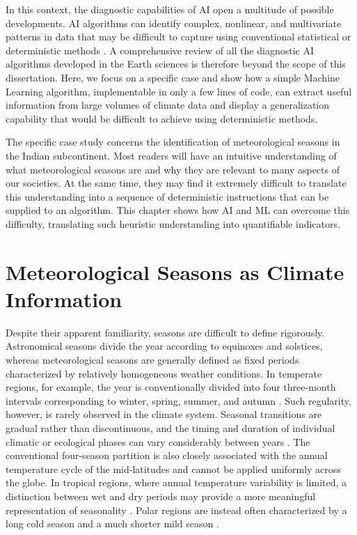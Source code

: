 In this context, the diagnostic capabilities of AI open a multitude of possible developments. AI algorithms can identify complex, nonlinear, and multivariate patterns in data that may be difficult to capture using conventional statistical or deterministic methods \citep{reichstein_deep_2019}. A comprehensive review of all the diagnostic AI algorithms developed in the Earth sciences is therefore beyond the scope of this dissertation. Here, we focus on a specific case and show how a simple Machine Learning algorithm, implementable in only a few lines of code, can extract useful information from large volumes of climate data and display a generalization capability that would be difficult to achieve using deterministic methods.

The specific case study concerns the identification of meteorological seasons in the Indian subcontinent. Most readers will have an intuitive understanding of what meteorological seasons are and why they are relevant to many aspects of our societies. At the same time, they may find it extremely difficult to translate this understanding into a sequence of deterministic instructions that can be supplied to an algorithm. This chapter shows how AI and ML can overcome this difficulty, translating such heuristic understanding into quantifiable indicators.



\section{Meteorological Seasons as Climate Information}

Despite their apparent familiarity, seasons are difficult to define rigorously. Astronomical seasons divide the year according to equinoxes and solstices, whereas meteorological seasons are generally defined as fixed periods characterized by relatively homogeneous weather conditions. In temperate regions, for example, the year is conventionally divided into four three-month intervals corresponding to winter, spring, summer, and autumn \citep{trenberth_what_1983}. Such regularity, however, is rarely observed in the climate system. Seasonal transitions are gradual rather than discontinuous, and the timing and duration of individual climatic or ecological phases can vary considerably between years \citep{littleboy_worldseasons_2024}. The conventional four-season partition is also closely associated with the annual temperature cycle of the mid-latitudes and cannot be applied uniformly across the globe. In tropical regions, where annual temperature variability is limited, a distinction between wet and dry periods may provide a more meaningful representation of seasonality \citep{guo_regime_2022,bruijnzeel_overview_2005}. Polar regions are instead often characterized by a long cold season and a much shorter mild season \citep{serreze_arctic_2014}.

